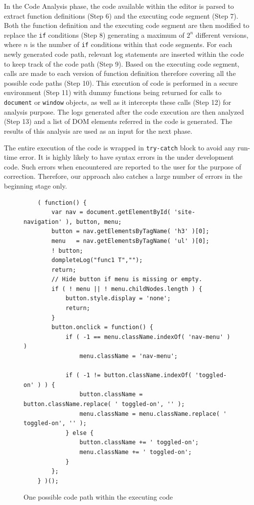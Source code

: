 		In the Code Analysis phase, the \javascript code available within the editor is parsed to extract function definitions (Step 6) and the executing code segment (Step 7). Both the function definition and the executing code segment are then modified to replace the \texttt{if} conditions (Step 8) generating a maximum of $2^n$ different versions, where $n$ is the number of \texttt{if} conditions within that code segments. For each newly generated code path, relevant log statements are inserted within the code to keep track of the code path (Step 9). Based on the executing code segment, calls are made to each version of function definition therefore covering all the possible code paths (Step 10). This execution of \javascript code is performed in a secure environment (Step 11) with dummy functions being returned for calls to \texttt{document} or \texttt{window} objects, as well as it intercepts these calls (Step 12) for analysis purpose. The logs generated after the code execution are then analyzed (Step 13) and a list of DOM elements referred in the code is generated. The results of this analysis are used as an input for the next phase.
		
		The entire execution of the code is wrapped in \texttt{try-catch} block to avoid any run-time error. It is highly likely to have syntax errors in the under development code. Such errors when encountered are reported to the user for the purpose of correction. Therefore, our approach also catches a large number of errors in the beginning stage only.
		
		
		\begin{figure}
			\medskip
			\begin{lstlisting}
	( function() {
		var nav = document.getElementById( 'site-navigation' ), button, menu;
		button = nav.getElementsByTagName( 'h3' )[0];
		menu   = nav.getElementsByTagName( 'ul' )[0];
		! button;
		dompleteLog("func1 T","");
		return;
		// Hide button if menu is missing or empty.
		if ( ! menu || ! menu.childNodes.length ) {
			button.style.display = 'none';
			return;
		}
		button.onclick = function() {
			if ( -1 == menu.className.indexOf( 'nav-menu' ) )
				menu.className = 'nav-menu';

			if ( -1 != button.className.indexOf( 'toggled-on' ) ) {	
				button.className = button.className.replace( ' toggled-on', '' );
				menu.className = menu.className.replace( ' toggled-on', '' );
			} else {
				button.className += ' toggled-on';
				menu.className += ' toggled-on';
			}
		};
	} )();
			\end{lstlisting}
			\caption{One possible code path within the executing code}
			\label{Fig:Path}
			\end{figure}
			
